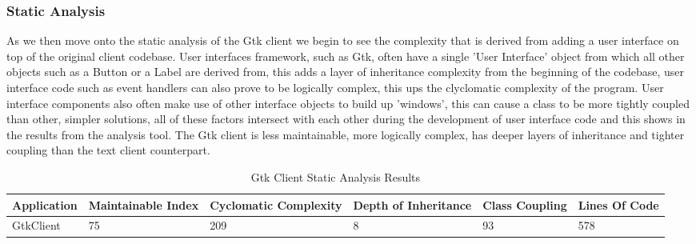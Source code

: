 \documentclass{article}
\begin{document}
\subsubsection{Static Analysis}
As we then move onto the static analysis of the Gtk client we begin to see the complexity that is derived from adding a user interface on top of the original client codebase. User interfaces framework, such as Gtk, often have a single 'User Interface' object from which all other objects such as a Button or a Label are derived from, this adds a layer of inheritance complexity from the beginning of the codebase, user interface code such as event handlers can also prove to be logically complex, this ups the clyclomatic complexity of the program. User interface components also often make use of other interface objects to build up 'windows', this can cause a class to be more tightly coupled than other, simpler solutions, all of these factors intersect with each other during the development of user interface code and this shows in the results from the analysis tool. The Gtk client is less maintainable, more logically complex, has deeper layers of inheritance and tighter coupling than the text client counterpart.
\begin{table}[H]
	\centering
	\caption{Gtk Client Static Analysis Results}
	\label{my-label}
	\begin{tabularx}{\textwidth}{|X|X|X|X|X|X|}
		\hline
		\textbf{Application} & \textbf{Maintainable Index} & \textbf{Cyclomatic Complexity} & \textbf{Depth of Inheritance} & \textbf{Class Coupling} & \textbf{Lines Of Code} \\ \hline
		GtkClient & 75 &     209      &      8     &     93      &      578     \\ \hline
	\end{tabularx}
\end{table}
\end{document}
